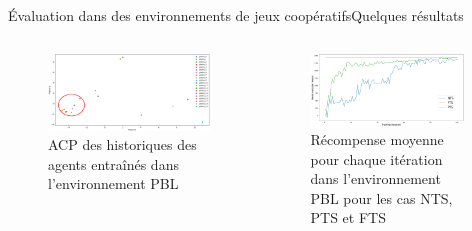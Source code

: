 \begin{frame}{Évaluation dans des environnements de jeux coopératifs}{Quelques résultats}

    \begin{columns}

        \begin{column}{0.5\textwidth}
            \begin{figure}[h!]
                \centering
                \includegraphics[width=\textwidth]{figures/prahom_pca_analysis.png}
                \caption*{ACP des historiques des agents entraînés dans l'environnement PBL}
                \label{fig:prahom_pca_analysis}
            \end{figure}
        \end{column}

        \hspace{1ex}

        \begin{column}{0.5\textwidth}
            \begin{figure}[h!]
                \centering
                \includegraphics[width=0.95\textwidth]{figures/prahom_learning_curve.png}
                \caption*{Récompense moyenne pour chaque itération dans l'environnement PBL pour les cas NTS, PTS et FTS}
                \label{fig:prahom_learning_curve}
            \end{figure}
        \end{column}

    \end{columns}

\end{frame}


